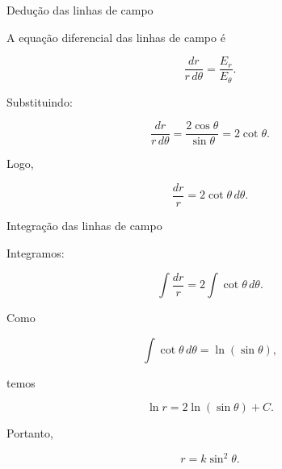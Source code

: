 \documentclass[aspectratio=169]{beamer}
\begin{document}
\begin{frame}{Dedução das linhas de campo}

A equação diferencial das linhas de campo é

\begin{eqbox}
\begin{equation}
\frac{dr}{r\,d\theta}
=
\frac{E_r}{E_\theta}.
\label{eq:linhas_campo_geral}
\end{equation}
\end{eqbox}

Substituindo:

\begin{eqbox}
\begin{equation}
\frac{dr}{r\,d\theta}
=
\frac{2\cos\theta}{\sin\theta}
=
2\cot\theta.
\label{eq:linhas_campo_intermediaria}
\end{equation}
\end{eqbox}

Logo,

\begin{eqbox}
\begin{equation}
\frac{dr}{r}
=
2\cot\theta\,d\theta.
\label{eq:linhas_campo_integrar}
\end{equation}
\end{eqbox}

\end{frame}

\begin{frame}{Integração das linhas de campo}

Integramos:

\begin{eqbox}
\begin{equation}
\int\frac{dr}{r}
=
2\int\cot\theta\,d\theta.
\label{eq:linhas_integral}
\end{equation}
\end{eqbox}

Como

\[
\int \cot\theta\,d\theta
=
\ln(\sin\theta),
\]

\end{frame}

\begin{frame}

temos

\begin{eqbox}
\begin{equation}
\ln r
=
2\ln(\sin\theta)+C.
\label{eq:linhas_log}
\end{equation}
\end{eqbox}

Portanto,

\begin{eqbox}
\begin{equation}
r
=
k\sin^2\theta.
\tag{4.12}
\label{eq:linhas_dipolo}
\end{equation}
\end{eqbox}

\end{frame}
\end{document}
